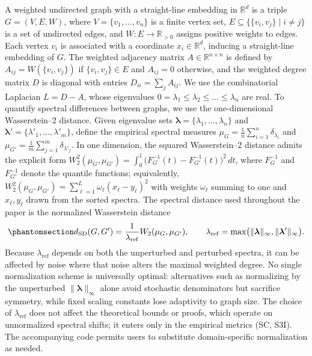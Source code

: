 \documentclass[
  11pt,
  letterpaper]{siamart251216}
\begin{document}
A weighted undirected graph with a straight-line embedding in
\(\mathbb{R}^d\) is a triple \(G = (V, E, W)\), where
\(V = \{v_1,\ldots,v_n\}\) is a finite vertex set,
\(E \subseteq \{\{v_i,v_j\} \mid i \neq j\}\) is a set of undirected
edges, and \(W : E \to \mathbb{R}_{>0}\) assigns positive weights to
edges. Each vertex \(v_i\) is associated with a coordinate
\(x_i \in \mathbb{R}^d\), inducing a straight-line embedding of \(G\).
The weighted adjacency matrix \(A \in \mathbb{R}^{n \times n}\) is
defined by \(A_{ij} = W(\{v_i,v_j\})\) if \(\{v_i,v_j\} \in E\) and
\(A_{ij} = 0\) otherwise, and the weighted degree matrix \(D\) is
diagonal with entries \(D_{ii} = \sum_j A_{ij}\). We use the
combinatorial Laplacian \(L = D - A\), whose eigenvalues
\(0 = \lambda_1 \le \lambda_2 \le \dots \le \lambda_n\) are real. To
quantify spectral differences between graphs, we use the one-dimensional
Wasserstein--2 distance. Given eigenvalue sets
\(\boldsymbol{\lambda}=\{\lambda_1,\ldots,\lambda_n\}\) and
\(\boldsymbol{\lambda}'=\{\lambda'_1,\ldots,\lambda'_m\}\), define the
empirical spectral measures
\(\mu_G = \frac{1}{n}\sum_{i=1}^n \delta_{\lambda_i}\) and
\(\mu_{G'} = \frac{1}{m}\sum_{j=1}^m \delta_{\lambda'_j}\). In one
dimension, the squared Wasserstein--2 distance admits the explicit form
\(W_2^2(\mu_G,\mu_{G'}) = \int_0^1 \bigl(F_G^{-1}(t)-F_{G'}^{-1}(t)\bigr)^2\,dt\),
where \(F_G^{-1}\) and \(F_{G'}^{-1}\) denote the quantile
functions\citep{santambrogio2015optimal}; equivalently,
\(W_2^2(\mu_G,\mu_{G'}) = \sum_{\ell=1}^L \omega_\ell (x_\ell-y_\ell)^2\)
with weights \(\omega_\ell\) summing to one and \(x_\ell,y_\ell\) drawn
from the sorted spectra. The spectral distance used throughout the paper
is the normalized Wasserstein distance
\begin{equation}\phantomsection\label{eq-w2-practical}{
d_{\mathrm{SD}}(G,G')
= \frac{1}{\lambda_{\mathrm{ref}}} W_2(\mu_G,\mu_{G'}), 
\qquad
\lambda_{\mathrm{ref}}
= \max\bigl(\|\boldsymbol{\lambda}\|_\infty,\|\boldsymbol{\lambda}'\|_\infty\bigr).
}\end{equation} Because \(\lambda_{\mathrm{ref}}\) depends on both the
unperturbed and perturbed spectra, it can be affected by noise where
that noise alters the maximal weighted degree. No single normalization
scheme is universally optimal: alternatives such as normalizing by the
unperturbed \(\|\boldsymbol{\lambda}\|_\infty\) alone avoid stochastic
denominators but sacrifice symmetry, while fixed scaling constants lose
adaptivity to graph size. The choice of \(\lambda_{\mathrm{ref}}\) does
not affect the theoretical bounds or proofs, which operate on
unnormalized spectral shifts; it enters only in the empirical metrics
(SC, S3I). The accompanying code permits users to substitute
domain-specific normalization as needed.
\end{document}
